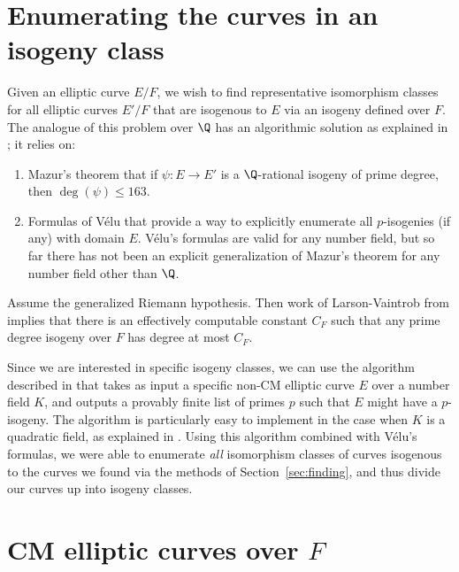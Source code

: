 \documentclass{amsart}
\begin{document}
\section{Enumerating the curves in an isogeny class}\label{sec:isoclass}

Given an elliptic curve $E/F$, we wish to find representative
isomorphism classes for all elliptic curves $E'/F$ that are isogenous
to $E$ via an isogeny defined over $F$. The analogue of this problem
over $\Q$ has an algorithmic solution as explained in
\cite[\S3.8]{cremona:algs}; it relies on:
\begin{enumerate}
\item  Mazur's theorem \cite{mazur:rational} 
that if $\psi:E\to E'$ is a $\Q$-rational isogeny of prime degree, 
then $\deg(\psi)\leq 163$.
\item Formulas of V\'elu \cite{velu:isogenies} 
that provide a way to explicitly enumerate all $p$-isogenies (if any) with domain $E$.  
V\'elu's formulas are valid for any number field, but so far there has not been an explicit
generalization of Mazur's theorem for any number field other than $\Q$. 
\end{enumerate}

\begin{remark}
  Assume the generalized Riemann hypothesis.  Then work of Larson-Vaintrob 
  from \cite{larson-vaintrob} implies that there is an effectively computable constant $C_F$ 
  such that any prime degree isogeny over $F$ has degree at most $C_F$.
\end{remark}

Since we are interested in specific isogeny classes, 
we can use the algorithm described in \cite{billerey:isog} that takes as
input a specific non-CM elliptic curve $E$ over a number field $K$, and
outputs a provably finite list of primes $p$ such that $E$ might have a
$p$-isogeny. The algorithm is particularly easy to implement in the
case when $K$ is a quadratic field, as explained in
\cite[\S2.3.4]{billerey:isog}.  Using this algorithm combined with
V\'elu's formulas, we were able to enumerate {\em all}
isomorphism classes of curves isogenous to the curves we found via the
methods of Section~\ref{sec:finding}, and thus divide our curves up into
isogeny classes.


\section{CM elliptic curves over $F$}\label{sec:cm}
\end{document}
